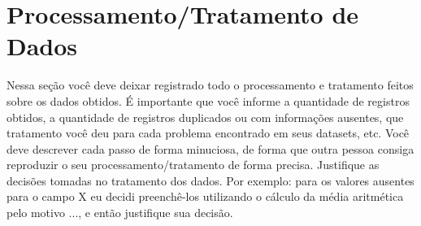 \chapter{Processamento/Tratamento de Dados}

Nessa seção você deve deixar registrado todo o processamento e tratamento feitos sobre os dados obtidos. É importante que você informe a quantidade de registros obtidos, a quantidade de registros duplicados ou com informações ausentes, que tratamento você deu para cada problema encontrado em seus datasets, etc. Você deve descrever cada passo de forma minuciosa, de forma que outra pessoa consiga reproduzir o seu processamento/tratamento de forma precisa. Justifique as decisões tomadas no tratamento dos dados. Por exemplo: para os valores ausentes para o campo X eu decidi preenchê-los utilizando o cálculo da média aritmética pelo motivo ..., e então justifique sua decisão. 
